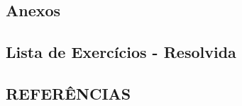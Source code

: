 \documentclass[12pt,a4paper]{report}
\begin{document}
\newpage

\begin{appendices}

    \chapter{Anexos}

    \section{Lista de Exercícios - Resolvida}
    

\end{appendices}

\newpage

\begin{center}
    \chapter*{REFERÊNCIAS}
\end{center}




\endgroup
\end{document}
